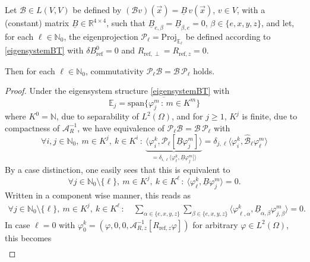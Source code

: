 \documentclass[10pt,a4paper]{amsart}
\newcommand\BB{\mathcal{B}}
\newcommand\Proj{\mathcal{P}}
\newcommand\calA{\mathcal{A}}
\newcommand\ulB{\underline{B}}
\newcommand\vecr{\vec{x}}
\begin{document}
\begin{lemma}\label{lem:comm_BT}
Let $\BB\in L(V,V)$ be defined by $(\BB v)(\vecr)=\ulB\, v(\vecr)$, $v\in V$, with a (constant) matrix $\ulB\in\mathbb{R}^{4\times4}$, such that $\ulB_{e,\beta}=\ulB_{\beta,e}=0$, $\beta\in\{e,x,y,z\}$, and let, for each $\ell\in\mathbb{N}_0$, the eigenprojection $\Proj_\ell=\text{Proj}_{\mathbb{E}_\ell}$ be defined according to \eqref{eigensystemBT} with $\delta B^0_{\text{ref}}=0$ and $R_{\text{ref},\perp}=R_{\text{ref},z}=0$.

Then for each $\ell\in\mathbb{N}_0$, commutativity
$\Proj_\ell\BB=\BB\,\Proj_\ell$
holds.
\end{lemma}

\begin{proof}
Under the eigensystem structure \eqref{eigensystemBT} with
\[
\mathbb{E}_j=\overline{\text{span}\{\varphi_j^m\,:\,m\in K^m\} }
\]
where $K^0=\mathbb{N}$, due to separability of $L^2(\Omega)$, and for $j\geq1$, $K^j$ is finite, due to compactness of $\calA_R^{-1}$, 
we have equivalence of $\Proj_\ell\BB=\BB\,\Proj_\ell$ with 
\[
\forall i,j\in \mathbb{N}_0, \ m\in K^j, \ k\in K^i \,:\
\underbrace{\langle \varphi_i^k,\Proj_\ell [\ulB \varphi_j^m] \rangle}_{
=\delta_{i,\ell} \langle \varphi_\ell^k,\ulB \varphi_j^m] \rangle}
= \delta_{j,\ell} \langle \varphi_i^k,\hat{\BB}_\ell \varphi_\ell^m \rangle 
\]
By a case distinction, one easily sees that 
this is equivalent to
\begin{equation}\label{commBB_orth}
\forall j\in \mathbb{N}_0\setminus\{\ell\}, \ m\in K^j, \ k\in K^\ell \,:\
\langle \varphi_\ell^k,\ulB \varphi_j^m \rangle=0.
\end{equation}
Written in a component wise manner, this reads as 
\begin{equation}\label{cond_comm_bxbybz}
\begin{aligned}
\forall j\in \mathbb{N}_0\setminus\{\ell\}, \ m\in K^j, \ k\in K^\ell \,:\
& 
\sum_{\alpha\in\{e,x,y,z\}} \sum_{\beta\in\{e,x,y,z\}}
\langle \varphi_{\ell,\alpha}^k,\ulB_{\alpha,\beta} \varphi_{j,\beta}^m \rangle
=0.
\end{aligned}
\end{equation}
In case $\ell=0$ with $\varphi_0^k=(\varphi,0,0, \calA_{R,z}^{-1}[R_{\text{ref},z}\varphi])$ for arbitrary $\varphi\in L^2(\Omega)$, this becomes
\[
\begin{aligned}

\end{aligned}\]
\end{proof}
\end{document}
